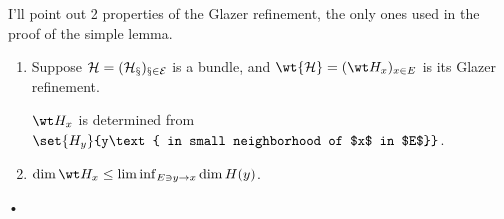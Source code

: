 I'll point out 2 properties of the Glazer refinement, %
the only ones used in the proof of the simple lemma. 
\begin{enumerate}
\item
Suppose $\cal H=(H_x)_{x\in E}$ is a bundle, and $\wt{\cal H}=(\wt H_x)_{x\in E}$ is its Glazer refinement.

$\wt H_x$ is determined from $\set{H_y}{y\text{ in small neighborhood of $x$ in $E$}}$.
\item
$\dim \wt H_x \le \liminf_{E\ni y\to x} \dim H(y)$. 

\end{enumerate}•